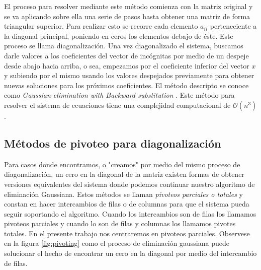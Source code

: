 El proceso para resolver mediante este método comienza con la matriz original y se va aplicando sobre ella una serie de pasos hasta obtener una matriz de forma triangular superior. Para realizar esto se recorre cada elemento $a_{ii}$ perteneciente a la diagonal principal, poniendo en ceros los elementos debajo de éste. Este proceso se llama diagonalización. Una vez diagonalizado el sistema, buscamos darle valores a los coeficientes del vector de incógnitas por medio de un despeje desde abajo hacia arriba, o sea, empezamos por el coeficiente inferior del vector $x$ y subiendo por el mismo usando los valores despejados previamente para obtener nuevas soluciones para los próximos coeficientes. El método descripto se conoce como \textit{Gaussian elimination with Backward substitution} \cite{Burden11}. Este método para resolver el sistema de ecuaciones tiene una complejidad computacional de $\mathcal{O}(n^3)$.

\subsection{Métodos de pivoteo para diagonalización}

Para casos donde encontramos, o "creamos" por medio del mismo proceso de diagonalización, un cero en la diagonal de la matriz existen formas de obtener versiones equivalentes del sistema donde podemos continuar nuestro algoritmo de eliminación Gaussiana. Estos métodos se llaman \textit{pivoteos parciales o totales} y constan en hacer intercambios de filas o de columnas para que el sistema pueda seguir soportando el algoritmo. Cuando los intercambios son de filas los llamamos pivoteos parciales y cuando lo son de filas y columnas los llamamos pivotes totales. En el presente trabajo nos centraremos en pivoteos parciales. Observese en la figura \ref{fig:pivoting} como el proceso de eliminación gaussiana puede solucionar el hecho de encontrar un cero en la diagonal por medio del intercambio de filas.


